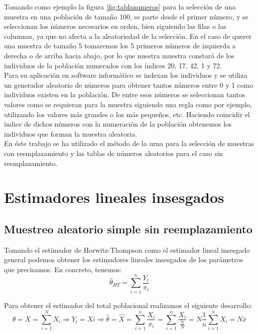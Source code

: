 Tomando como ejemplo la figura \ref{fig:tablanumeros} para la selección de una muestra en una población de tamaño 100, se parte desde el primer número, y se seleccionan los números necesarios en orden, bien siguiendo las filas o las columnas, ya que no afecta a la aleatoriedad de la selección. En el caso de querer una muestra de tamaño 5 tomaremos los 5 primeros números de izquierda a derecha o de  arriba hacia abajo, por lo que nuestra muestra constará de los individuos de la población numerados con los índices 20, 17, 42, 1 y 72.\\

Para su aplicación en software informático se indexan los individuos y se utiliza un generador aleatorio de números para obtener tantos números entre 0 y 1 como individuos existen en la población. De entre esos números se seleccionan tantos valores como se requieran para la muestra siguiendo una regla como por ejemplo, utilizando los valores más grandes o los más pequeños, etc. Haciendo coincidir el índice de dichos números con la numeración de la población obtenemos los individuos que forman la muestra aleatoria.\\

En éste trabajo se ha utilizado el método de la urna para la selección de muestras con reemplazamiento y las tablas de números aleatorios para el caso sin reemplazamiento.\\


\section{Estimadores lineales insesgados} \label{sect:3.2}
\subsection{Muestreo aleatorio simple sin reemplazamiento}
Tomando el estimador de Horwitz-Thompson como el estimador lineal insesgado general podemos obtener los estimadores lineales insesgados de los parámetros que precisamos. En concreto, tenemos:\\
\begin{equation}\label{eq:2}
    \hat{\theta}_{HT} = \sum_{i=1}^{n}\frac{Y_i}{\pi_i}
\end{equation}

Para obtener el estimador del total poblacional realizamos el siguiente desarrollo:\\

\begin{equation}\label{eq:3}
    \theta = X = \sum_{i=1}^{N}X_i \Rightarrow Y_i = Xi \Rightarrow \hat{\theta} = \hat{X} = \sum_{i=1}^{n}\frac{X_i}{\pi_i} = \sum_{i=1}^{n}\frac{X_i}{\frac{n}{N}} = N\frac{1}{n}\sum_{i=1}^{n}X_i = N\bar{x}
\end{equation}

